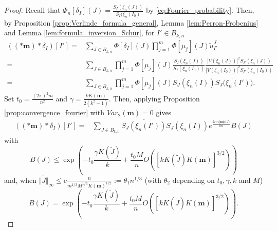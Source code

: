 \documentclass[10pt,11pt]{amsart}%
\begin{document}
\begin{proof}
Recall that $\Phi_n[\delta_I](J)=\frac{S_{I}(\xi_{n}(J))}{S_{I}(\xi_{n}(I_0)}$ by \eqref{eq:Fourier_probability}. Then, by Proposition \ref{prop:Verlinde_formula_general}, Lemma \ref{lem:Perron-Frobenius} and Lemma \ref{lem:formula_inversion_Schur}, for $I'\in B_{k,n}$
\begin{align*}\left(\left(\ast \mathbf{m}\right)\ast \delta_I\right)[I']=&\sum_{J\in B_{k,n}}\Phi[\delta_I](J)\prod_{j=1}^m\Phi[\mu_j](J)\tilde{u}^J_{I'}\\
=&\sum_{J\in B_{k,n}}\prod_{j=1}^m\Phi[\mu_j](J)\frac{S_{I}(\xi_{n}(J))}{S_{I}(\xi_{n}(I_0))}\frac{\left\vert V(\xi_{n}(J))\right\vert^2\overline{S_{I'}(\xi_{n}(J))}}{\left\vert V(\xi_{n}(I_0))\right\vert^2S_{I'}(\xi_{n}(I_0))}\\
=&\sum_{J\in B_{k,n}}\prod_{j=1}^m\Phi[\mu_j](J)S_{J}(\xi_{n}(I))\overline{S_{J}(\xi_{n}(I')}).
\end{align*}
Set $t_0=\frac{(2\pi)^2m}{n^2}$ and $\gamma=\frac{kK(\mathbf{m})}{2(k^2-1)}$. Then, applying Proposition \ref{prop:convergence_fourier} with $Var_2(\mathbf{m})=0$ gives
\begin{align*}
\left(\left(\ast \mathbf{m}\right)\ast \delta_I\right)[I']=&\sum_{J\in B_{k,n}}\overline{S_{J}(\xi_{n}(I'))}S_{J}(\xi_{n}(I))e^{\frac{2i m\langle\mathbf{m}\rangle\langle J\rangle}{kn}}B(J)
\end{align*}
with 
$$B(J)\leq\exp\left(-t_0\frac{\gamma K(\tilde{J})}{k}+\frac{t_0M}{n}O\left(\left[kK(\tilde{J})K(\mathbf{m})\right]^{3/2}\right)\right)$$
and, when $\Vert \tilde{J}\Vert_{\infty}\leq c\frac{n}{m^{1/3}M^{1/3}K(\mathbf{m})^{1/2}}:=\theta_1 n^{1/3}$ (with $\theta_2$ depending on $t_0,\gamma,k$ and $M$)
$$B(J)=\exp\left(-t_0\frac{\gamma K(\tilde{J})}{k}+\frac{t_0M}{n}O\left(\left[kK(\tilde{J})K(\mathbf{m})\right]^{3/2}\right)\right).$$


\end{proof}
\end{document}
